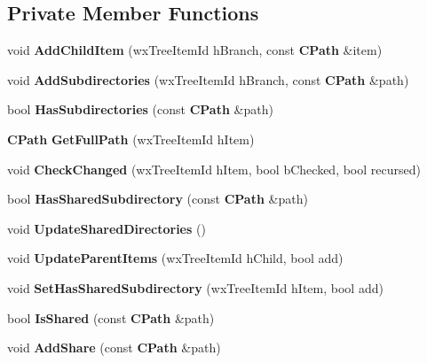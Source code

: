 \subsection*{Private Member Functions}
\begin{DoxyCompactItemize}
\item 
void {\bfseries AddChildItem} (wxTreeItemId hBranch, const {\bf CPath} \&item)\label{classCDirectoryTreeCtrl_ab309a3553e437c07483b4cc8fb142b85}

\item 
void {\bfseries AddSubdirectories} (wxTreeItemId hBranch, const {\bf CPath} \&path)\label{classCDirectoryTreeCtrl_af74eac8ede4c4fa41597fc2c6623f8d6}

\item 
bool {\bfseries HasSubdirectories} (const {\bf CPath} \&path)\label{classCDirectoryTreeCtrl_a4737c7085cbf3f2a96e61acdd7998cdf}

\item 
{\bf CPath} {\bfseries GetFullPath} (wxTreeItemId hItem)\label{classCDirectoryTreeCtrl_ad8fd6761e20a7f05832a2e840d120156}

\item 
void {\bfseries CheckChanged} (wxTreeItemId hItem, bool bChecked, bool recursed)\label{classCDirectoryTreeCtrl_aa49854c3e6c3290de9c437d63ce13c9d}

\item 
bool {\bfseries HasSharedSubdirectory} (const {\bf CPath} \&path)\label{classCDirectoryTreeCtrl_aa541bbb4bf58879032d35d3cef2283b5}

\item 
void {\bfseries UpdateSharedDirectories} ()\label{classCDirectoryTreeCtrl_a3ad30761b7a4a597a9468abbcf4ff5f4}

\item 
void {\bfseries UpdateParentItems} (wxTreeItemId hChild, bool add)\label{classCDirectoryTreeCtrl_afbeb9a846aa230bda3f1df999be3a8c5}

\item 
void {\bfseries SetHasSharedSubdirectory} (wxTreeItemId hItem, bool add)\label{classCDirectoryTreeCtrl_a7e3269ed1352734ab4a99a74430a6238}

\item 
bool {\bfseries IsShared} (const {\bf CPath} \&path)\label{classCDirectoryTreeCtrl_aadf20ca13404f4d1855d0b8e302f4b52}

\item 
void {\bfseries AddShare} (const {\bf CPath} \&path)\label{classCDirectoryTreeCtrl_ac48f34e7594575ff8680d210667bdcd2}


\end{DoxyCompactItemize}
